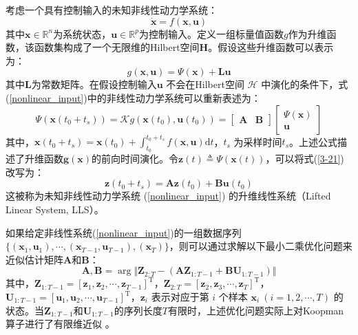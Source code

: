 \documentclass[lang=chs, degree=master, blindreview=true, winfonts=true]{yanputhesis}
\begin{document}
考虑一个具有控制输入的未知非线性动力学系统： 
\begin{equation} 
	\dot{\bm{x}} = {f}(\bm{x},\bm{u}) \label{nonlinear_input} \end{equation} 
其中$\bm{x} \in \mathbb{R}^n$为系统状态，$\bm{u} \in \mathbb{R}^p$为控制输入。定义一组标量值函数${g}$作为升维函数，该函数集构成了一个无限维的Hilbert空间$\mathcal{\bm H}$。假设这些升维函数可以表示为： 
\begin{equation} 
	{g}(\bm{x},\bm{u}) = {\Psi}(\bm{x}) + \bm{L}\bm{u} 
\end{equation} 
其中$\bm{L}$为常数矩阵。在假设控制输入$\bm{u}$ 不会在Hilbert空间 $\mathcal{H}$ 中演化的条件下，式(\ref{nonlinear_input})中的非线性动力学系统可以重新表述为： 
\begin{equation} 
	{\Psi}(\bm{x}(t_0+t_s)) = {\mathcal{K}} {g}(\bm{x}(t_0), \bm{u}(t_0)) = \begin{bmatrix}\bm A&\bm B\end{bmatrix}\begin{bmatrix}\Psi(\bm x)\\\bm u\end{bmatrix}
\label{3-21} 
\end{equation} 
其中，$\bm{x}(t_0+t_s)=\bm{x}(t_0)+\int_{t_0}^{t_0+t_s}{f}(\bm{x},\bm{u}){\mathrm{d}t}$，$t_s$ 为采样时间$t_s$。上述公式描述了升维函数$\bm{g}(\bm{x})$的前向时间演化。令$\bm{z}(t) \triangleq {\Psi}(\bm{x}(t))$，可以将式(\ref{3-21})改写为： 
\begin{equation} \bm{z}(t_0 + t_s) = \bm{A}\bm{z}(t_0) + \bm{B}\bm{u}(t_0) \label{lls} 
\end{equation} 
这被称为未知非线性动力学系统 (\ref{nonlinear_input}) 的升维线性系统（Lifted Linear System, LLS）。

如果给定非线性系统(\ref{nonlinear_input})的一组数据序列 $\{(\bm{x}_1,\bm{u}_1),\cdots,(\bm{x}_{T-1},\bm{u}_{T-1}),(\bm{x}_T)\}$，则可以通过求解以下最小二乘优化问题来近似估计矩阵$\bm{A}$和$\bm{B}$：
\begin{equation}
	\bm{A},\bm{B} = \mathop{\arg\min\limits_{\bm{A},\bm{B}}} \Vert \bm{Z}_{2:T} - (\bm{A}\bm{Z}_{1:T-1}+\bm{B}\bm{U}_{1:T-1}) \Vert \label{LS_AB}
\end{equation} 
其中，$\bm{Z}_{1:T-1}= [ \bm{z}_1,\bm{z}_2,\cdots,\bm{z}_{T-1} ]^\mathrm{T}$，$\bm{Z}_{2:T}= [\bm{z}_2,\bm{z}_3,\cdots,\bm{z}_{T}]^\mathrm{T}$，$\bm{U}_{1:T-1}= [\bm{u}_1,\bm{u}_2,\cdots,\bm{u}_{T-1}]^\mathrm{T}$，$\bm{z}_i$ 表示对应于第 $i$ 个样本 $\bm{x}_i\ (i=1,2,\cdots,T)$ 的状态。当$\bm{Z}_{1:T-1}$和$\bm{U}_{1:T-1}$的序列长度$T$有限时，上述优化问题实际上对Koopman算子进行了有限维近似 \cite{Hao2024}。
\end{document}
